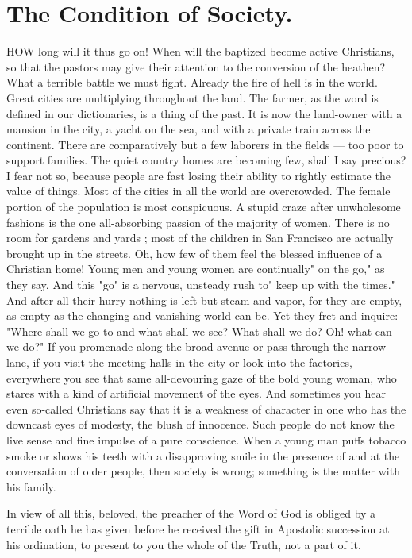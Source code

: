 \chapter{The Condition of Society.}

HOW long will it thus go on! When will 
the baptized become active Christians, so 
that the pastors may give their attention to the 
conversion of the heathen? What a terrible 
battle we must fight. Already the fire of hell 
is in the world. Great cities are multiplying 
throughout the land. The farmer, as the word 
is defined in our dictionaries, is a thing of the 
past. It is now the land-owner with a mansion 
in the city, a yacht on the sea, and with a private 
train across the continent. There are comparatively
but a few laborers in the fields — too poor 
to support families. The quiet country homes 
are becoming few, shall I say precious? I fear 
not so, because people are fast losing their 
ability to rightly estimate the value of things. 
Most of the cities in all the world are overcrowded.
The female portion of the population 
is most conspicuous. A stupid craze after 
unwholesome fashions is the one all-absorbing 
passion of the majority of women. There is no 
room for gardens and yards ; most of the children
in San Francisco are actually brought up 
in the streets. Oh, how few of them feel the 
blessed influence of a Christian home! Young 
men and young women are continually" on the 
go," as they say. And this "go" is a nervous, 
unsteady rush to" keep up with the times." And 
after all their hurry nothing is left but steam 
and vapor, for they are empty, as empty as the 
changing and vanishing world can be. Yet they 
fret and inquire: "Where shall we go to and 
what shall we see? What shall we do? Oh! 
what can we do?" If you promenade along the 
broad avenue or pass through the narrow lane, 
if you visit the meeting halls in the city or look 
into the factories, everywhere you see that same 
all-devouring gaze of the bold young woman, 
who stares with a kind of artificial movement of 
the eyes. And sometimes you hear even so-called
Christians say that it is a weakness of 
character in one who has the downcast eyes of 
modesty, the blush of innocence. Such people 
do not know the live sense and fine impulse of a 
pure conscience. When a young man puffs 
tobacco smoke or shows his teeth with a disapproving
smile in the presence of and at the 
conversation of older people, then society is
wrong; something is the matter with his family. 

In view of all this, beloved, the preacher of 
the Word of God is obliged by a terrible oath 
he has given before he received the gift in 
Apostolic succession at his ordination, to present 
to you the whole of the Truth, not a part of it. 

